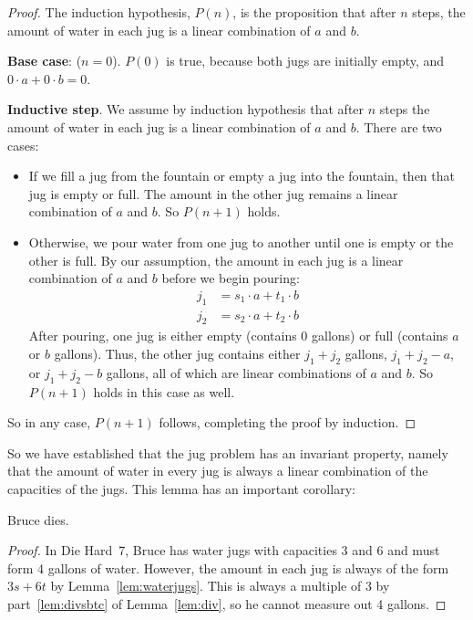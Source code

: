 \begin{proof}
The induction hypothesis, $P(n)$, is the proposition that after $n$
steps, the amount of water in each jug is a linear combination of $a$
and $b$.

\noindent \textbf{Base case}: ($n = 0$).  $P(0)$ is true, because both jugs are
initially empty, and $0 \cdot a + 0 \cdot b = 0$.

\noindent \textbf{Inductive step}.  We assume by induction hypothesis that
after $n$ steps the amount of water in each jug is a linear combination of
$a$ and $b$.  There are two cases:
%
\begin{itemize}
%
\item If we fill a jug from the fountain or empty a jug into the
fountain, then that jug is empty or full.  The amount in the other jug
remains a linear combination of $a$ and $b$.  So $P(n+1)$ holds.

\item Otherwise, we pour water from one jug to another until one is
empty or the other is full.  By our assumption, the amount in each jug
is a linear combination of $a$ and $b$ before we begin pouring:
%
\begin{align*}
j_1 & = s_1 \cdot a + t_1 \cdot b \\
j_2 & = s_2 \cdot a + t_2 \cdot b
\end{align*}
%
After pouring, one jug is either empty (contains 0 gallons) or full
(contains $a$ or $b$ gallons).  Thus, the other jug contains either
$j_1 + j_2$ gallons, $j_1 + j_2 - a$, or $j_1 + j_2 - b$ gallons, all
of which are linear combinations of $a$ and $b$.  So $P(n+1)$ holds in
this case as well.
\end{itemize}
%
So in any case,  $P(n+1)$ follows, completing the proof by induction.
\end{proof}

So we have established that the jug problem has an invariant property,
namely that the amount of water in every jug is always a linear
combination of the capacities of the jugs.
This lemma has an important corollary:
\begin{corollary}
Bruce dies.
\end{corollary}

\begin{proof}
In Die Hard~7, Bruce has water jugs with capacities 3 and 6 and must
form 4 gallons of water.  However, the amount in each jug is always of
the form $3s + 6t$ by Lemma~\ref{lem:waterjugs}.  This is always a
multiple of 3 by part~\ref{lem:divsbtc} of Lemma~\ref{lem:div}, so he cannot
measure out 4 gallons.
\end{proof}

